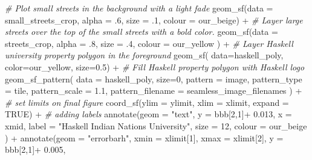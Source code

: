 \documentclass[
  paper=a4,
  ,captions=tableheading
]{scrartcl}
\newenvironment{Shaded}{\begin{snugshade}}{\end{snugshade}}
\newcommand{\AttributeTok}[1]{\textcolor[rgb]{0.77,0.63,0.00}{#1}}
\newcommand{\CommentTok}[1]{\textcolor[rgb]{0.56,0.35,0.01}{\textit{#1}}}
\newcommand{\ConstantTok}[1]{\textcolor[rgb]{0.00,0.00,0.00}{#1}}
\newcommand{\DecValTok}[1]{\textcolor[rgb]{0.00,0.00,0.81}{#1}}
\newcommand{\FloatTok}[1]{\textcolor[rgb]{0.00,0.00,0.81}{#1}}
\newcommand{\FunctionTok}[1]{\textcolor[rgb]{0.00,0.00,0.00}{#1}}
\newcommand{\NormalTok}[1]{#1}
\newcommand{\SpecialCharTok}[1]{\textcolor[rgb]{0.00,0.00,0.00}{#1}}
\newcommand{\StringTok}[1]{\textcolor[rgb]{0.31,0.60,0.02}{#1}}
\begin{document}
\begin{Shaded}
\begin{Highlighting}[]
  \CommentTok{\# Plot small streets in the background with a light fade}
  \FunctionTok{geom\_sf}\NormalTok{(}\AttributeTok{data =}\NormalTok{ small\_streets\_crop, }\AttributeTok{alpha =}\NormalTok{ .}\DecValTok{6}\NormalTok{, }
          \AttributeTok{size =}\NormalTok{ .}\DecValTok{1}\NormalTok{, }\AttributeTok{colour =}\NormalTok{ our\_beige) }\SpecialCharTok{+}
  \CommentTok{\# Layer large streets over the top of the small streets with a bold color.}
  \FunctionTok{geom\_sf}\NormalTok{(}\AttributeTok{data =}\NormalTok{ streets\_crop, }\AttributeTok{alpha =}\NormalTok{ .}\DecValTok{8}\NormalTok{, }
          \AttributeTok{size =}\NormalTok{ .}\DecValTok{4}\NormalTok{, }\AttributeTok{colour =}\NormalTok{ our\_yellow ) }\SpecialCharTok{+}
  \CommentTok{\# Layer Haskell university property polygon in the foreground}
  \FunctionTok{geom\_sf}\NormalTok{( }\AttributeTok{data=}\NormalTok{haskell\_poly, }\AttributeTok{color=}\NormalTok{our\_yellow, }\AttributeTok{size=}\FloatTok{0.5}\NormalTok{) }\SpecialCharTok{+}
  \CommentTok{\# Fill Haskell property polygon with Haskell logo}
   \FunctionTok{geom\_sf\_pattern}\NormalTok{( }
     \AttributeTok{data =}\NormalTok{ haskell\_poly,}
     \AttributeTok{size=}\DecValTok{0}\NormalTok{,}
    \AttributeTok{pattern       =} \StringTok{\textquotesingle{}image\textquotesingle{}}\NormalTok{,}
    \AttributeTok{pattern\_type  =} \StringTok{\textquotesingle{}tile\textquotesingle{}}\NormalTok{,}
    \AttributeTok{pattern\_scale =} \FloatTok{1.1}\NormalTok{,}
    \AttributeTok{pattern\_filename =}\NormalTok{ seamless\_image\_filenames}
\NormalTok{  ) }\SpecialCharTok{+}
  \CommentTok{\# set limits on final figure }
  \FunctionTok{coord\_sf}\NormalTok{(}\AttributeTok{ylim =}\NormalTok{ ylimit, }\AttributeTok{xlim =}\NormalTok{ xlimit, }\AttributeTok{expand =} \ConstantTok{TRUE}\NormalTok{) }\SpecialCharTok{+}
  \CommentTok{\# adding labels}
  \FunctionTok{annotate}\NormalTok{(}\AttributeTok{geom =} \StringTok{"text"}\NormalTok{, }\AttributeTok{y =}\NormalTok{ bbb[}\DecValTok{2}\NormalTok{,}\DecValTok{1}\NormalTok{]}\SpecialCharTok{+} \FloatTok{0.013}\NormalTok{, }\AttributeTok{x =}\NormalTok{ xmid, }
           \AttributeTok{label =} \StringTok{"Haskell Indian Nations University"}\NormalTok{, }\AttributeTok{size =} \DecValTok{12}\NormalTok{, }\AttributeTok{colour =}\NormalTok{ our\_beige}
\NormalTok{           ) }\SpecialCharTok{+}
  \FunctionTok{annotate}\NormalTok{(}\AttributeTok{geom =} \StringTok{"errorbarh"}\NormalTok{, }\AttributeTok{xmin =}\NormalTok{ xlimit[}\DecValTok{1}\NormalTok{], }\AttributeTok{xmax =}\NormalTok{ xlimit[}\DecValTok{2}\NormalTok{], }\AttributeTok{y =}\NormalTok{ bbb[}\DecValTok{2}\NormalTok{,}\DecValTok{1}\NormalTok{]}\SpecialCharTok{+} \FloatTok{0.005}\NormalTok{,   }

\end{Highlighting}
\end{Shaded}
\end{document}
